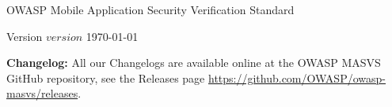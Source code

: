 \thispagestyle{empty} %

OWASP Mobile Application Security Verification Standard


Version $version$ \today

\textbf{Changelog:} All our Changelogs are available online at the OWASP MASVS GitHub repository, see the Releases page \url{https://github.com/OWASP/owasp-masvs/releases}.
